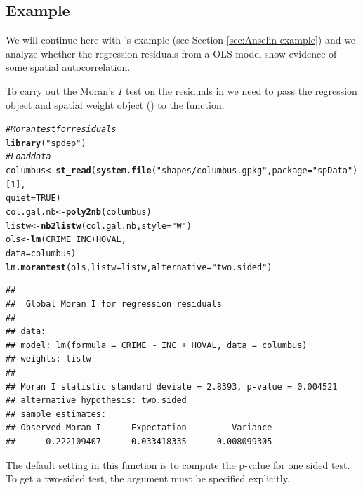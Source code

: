 \documentclass[english,12pt]{book}\usepackage[]{graphicx}\usepackage[]{xcolor}
\makeatletter
\newcommand{\hlnum}[1]{\textcolor[rgb]{0.686,0.059,0.569}{#1}}%
\newcommand{\hlsng}[1]{\textcolor[rgb]{0.192,0.494,0.8}{#1}}%
\newcommand{\hlcom}[1]{\textcolor[rgb]{0.678,0.584,0.686}{\textit{#1}}}%
\newcommand{\hlopt}[1]{\textcolor[rgb]{0,0,0}{#1}}%
\newcommand{\hldef}[1]{\textcolor[rgb]{0.345,0.345,0.345}{#1}}%
\newcommand{\hlkwb}[1]{\textcolor[rgb]{0.69,0.353,0.396}{#1}}%
\newcommand{\hlkwc}[1]{\textcolor[rgb]{0.333,0.667,0.333}{#1}}%
\newcommand{\hlkwd}[1]{\textcolor[rgb]{0.737,0.353,0.396}{\textbf{#1}}}%
\newenvironment{kframe}{%
 \def\at@end@of@kframe{}%
 \ifinner\ifhmode%
  \def\at@end@of@kframe{\end{minipage}}%
  \begin{minipage}{\columnwidth}%
 \fi\fi%
 \def\FrameCommand##1{\hskip\@totalleftmargin \hskip-\fboxsep
 \colorbox{shadecolor}{##1}\hskip-\fboxsep
     \hskip-\linewidth \hskip-\@totalleftmargin \hskip\columnwidth}%
 \MakeFramed {\advance\hsize-\width
   \@totalleftmargin\z@ \linewidth\hsize
   \@setminipage}}%
 {\par\unskip\endMakeFramed%
 \at@end@of@kframe}
\newenvironment{knitrout}{}{} %
\makeatother
\begin{document}
\subsection{Example}

We will continue here with \cite{anselin1988spatial}'s example (see Section \ref{sec:Anselin-example}) and we analyze whether the regression residuals from a OLS model show evidence of some spatial autocorrelation. 

To carry out the Moran's $I$ test on the residuals in  we need to pass the regression object and spatial weight object () to the  function. 

\begin{knitrout}
\color{fgcolor}\begin{kframe}
\begin{alltt}
\hlcom{# Moran test for residuals}
\hlkwd{library}\hldef{(}\hlsng{"spdep"}\hldef{)}
\hlcom{# Load data}
\hldef{columbus} \hlkwb{<-} \hlkwd{st_read}\hldef{(}\hlkwd{system.file}\hldef{(}\hlsng{"shapes/columbus.gpkg"}\hldef{,} \hlkwc{package}\hldef{=}\hlsng{"spData"}\hldef{)[}\hlnum{1}\hldef{],}
                           \hlkwc{quiet} \hldef{=} \hlnum{TRUE}\hldef{)}
\hldef{col.gal.nb} \hlkwb{<-} \hlkwd{poly2nb}\hldef{(columbus)}
\hldef{listw} \hlkwb{<-} \hlkwd{nb2listw}\hldef{(col.gal.nb,} \hlkwc{style} \hldef{=} \hlsng{"W"}\hldef{)}
\hldef{ols} \hlkwb{<-} \hlkwd{lm}\hldef{(CRIME} \hlopt{~} \hldef{INC} \hlopt{+} \hldef{HOVAL,}
          \hlkwc{data} \hldef{=  columbus)}
\hlkwd{lm.morantest}\hldef{(ols,} \hlkwc{listw} \hldef{= listw,} \hlkwc{alternative} \hldef{=} \hlsng{"two.sided"}\hldef{)}
\end{alltt}
\begin{verbatim}
## 
## 	Global Moran I for regression residuals
## 
## data:  
## model: lm(formula = CRIME ~ INC + HOVAL, data = columbus)
## weights: listw
## 
## Moran I statistic standard deviate = 2.8393, p-value = 0.004521
## alternative hypothesis: two.sided
## sample estimates:
## Observed Moran I      Expectation         Variance 
##      0.222109407     -0.033418335      0.008099305
\end{verbatim}
\end{kframe}
\end{knitrout}

The default setting in this function is to compute the p-value for one sided test. To get a two-sided test, the  argument must be specified explicitly. 
\end{document}
